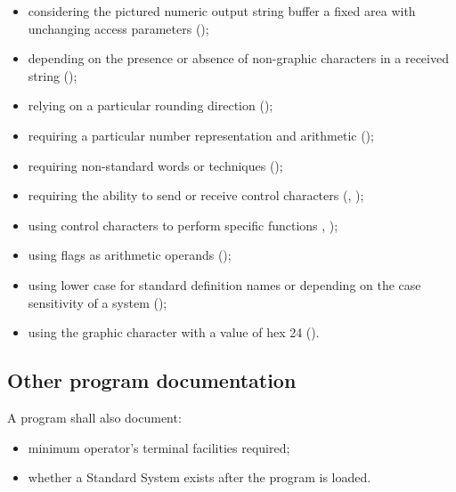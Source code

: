 \begin{itemize}

\item considering the pictured numeric output string buffer a fixed
	area with unchanging access parameters
	();

\item depending on the presence or absence of non-graphic characters
	in a received string ();

\item relying on a particular rounding direction
	();

\item requiring a particular number representation and arithmetic
	();

\item requiring non-standard words or techniques
	();

\item requiring the ability to send or receive control characters
	(,
	);

\item using control characters to perform specific functions
	, );

\item using flags as arithmetic operands
	();

\item using lower case for standard definition names or depending
	on the case sensitivity of a system
	();

\item using the graphic character with a value of hex 24
	().

\end{itemize}

\subsection{Other program documentation} %

A program shall also document:

\begin{itemize}

\item minimum operator's terminal facilities required;

\item whether a Standard System exists after the program is loaded.

\end{itemize}
